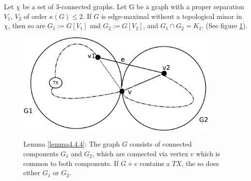 \begin{lemma}\label{lemma4.4.4}
	\centering
Let $\chi$ be a set of 3-connected graphs. Let G be a graph with a proper separation {$V_1$, $V_2$} of order $\kappa(G)\leq 2$. If $G$ is edge-maximal without a topological minor in $\chi$, then so are $G_1:=G[V_1]$ and $G_2:=G[V_2]$, and $G_1 \cap G_2 = K_2$. (See figure \ref{figLemma4.4.4}).
\end{lemma}
\begin{figure}[htbp]
	\centering
	\includegraphics[height=2in]{figLemma4.4.4.eps} \\ 
	\caption{Lemma \ref{lemma4.4.4}: The graph $G$ consists of connected components $G_1$ and $G_2$, which are connected via vertex $v$ which is common to both components. If $G+e$ contains a $TX$, the so does either $G_1$ or $G_2$.}
\label{figLemma4.4.4}
\end{figure}

